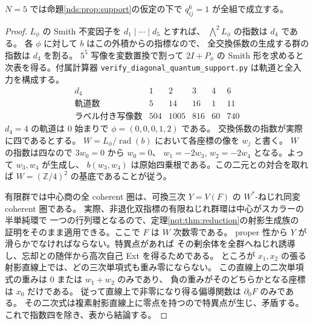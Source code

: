\begin{corollary}\label{nds:cor:six}
$N=5$ では命題\ref{nds:prop:support}の仮定の下で $q_{ij}^6=1$ が全組で成立する。
\end{corollary}
\begin{proof}
$L_\phi$ の Smith 不変因子を $d_1\mid\cdots\mid d_5$ とすれば、
$\bigwedge^2 L_\phi$ の指数は $d_4$ である。
各 $\phi$ に対して $b$ はこの外積からの指標なので、
全交換係数の生成する群の指数は $d_4$ を割る。
$5^5$ 写像を変数置換で割って $2I+P_\phi$ の Smith 形を求めると
次表を得る。付属計算器
\texttt{verify\_diagonal\_quantum\_support.py} は軌道と全入力を構成する。
\[
\begin{array}{c|rrrrr}
d_4&1&2&3&4&6\\\hline
\text{軌道数}&5&14&16&1&11\\
\text{ラベル付き写像数}&504&1005&816&60&740
\end{array}
\]
$d_4=4$ の軌道は $0$ 始まりで $\phi=(0,0,0,1,2)$ である。
交換係数の指数が実際に四であるとする。
$W=L_\phi/\operatorname{rad}(b)$ において各座標の像を $w_j$ と書く。
$W$ の指数は四なので $3w_0=0$ から $w_0=0$、
$w_1=-2w_3$, $w_2=-2w_4$ となる。よって $w_3,w_4$ が生成し、
$b(w_3,w_4)$ は原始四乗根である。この二元との対合を取れば
$W=(\mathbb Z/4)^2$ の基底であることが従う。

有限群では中心商の全 coherent 圏は、可換三次 $Y=V(F)$ の
$W^*$-ねじれ同変 coherent 圏である。
実際、非退化双指標の有限ねじれ群環は中心がスカラーの半単純環で
一つの行列環となるので、定理\ref{nqt:thm:reduction}の射影生成族の
証明をそのまま適用できる。ここで $F$ は $W$ 次数零である。
proper 性から $Y$ が滑らかでなければならない。特異点があれば
その剰余体を全群へねじれ誘導し、忘却との随伴から高次自己 Ext を得るためである。
ところが $x_1,x_2$ の張る射影直線上では、どの三次単項式も重み零にならない。
この直線上の二次単項式の重みは $0$ または $w_1+w_2$ のみであり、
負の重みがそのどちらかとなる座標は $x_0$ だけである。
従って直線上で非零になり得る偏導関数は $\partial_0F$ のみである。
その二次式は複素射影直線上に零点を持つので特異点が生じ、矛盾する。
これで指数四を除き、表から結論する。
\end{proof}
